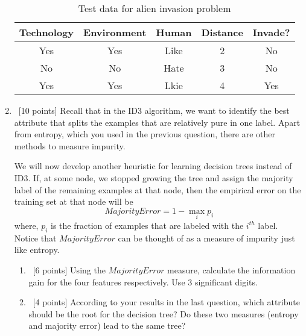 \begin{enumerate}
        \begin{table}[h]
        \centering
        \begin{tabular}{cccc|c}
        \hline
        Technology & Environment & Human & Distance & Invade? \\ \hline
        Yes        & Yes         & Like  & 2        & No       \\
        No         & No          & Hate  & 3        & No       \\
        Yes        & Yes         & Lkie  & 4        & Yes       \\ \hline
        \end{tabular}
        \caption{Test data for alien invasion problem}\label{tb-alien-test}
        \end{table}

    \item~[10 points] Recall that in the ID3 algorithm, we want to identify the best attribute that splits the examples that are relatively pure in one label.
    Apart from entropy, which you used in the previous question, there are other methods to measure impurity.

    We will now develop another heuristic for learning decision trees instead of ID3. If, at some node, we stopped growing the tree and assign the majority label of the remaining examples at that node, then the empirical error on the training set at that node will be
    $$MajorityError = 1 - \max_{i}p_i$$
    where, $p_i$ is the fraction of examples that are labeled with the $i^{th}$ label. Notice that $MajorityError$ can be thought of as a measure of impurity just like entropy.

    \begin{enumerate}
        \item~[6 points] Using the $MajorityError$ measure, calculate the information gain for the four features respectively. Use 3 significant digits.
        \item~[4 points] According to your results in the last question, which attribute should be the root for the decision tree? Do these two measures (entropy and majority error) lead to the same tree?
    \end{enumerate}

\end{enumerate}

